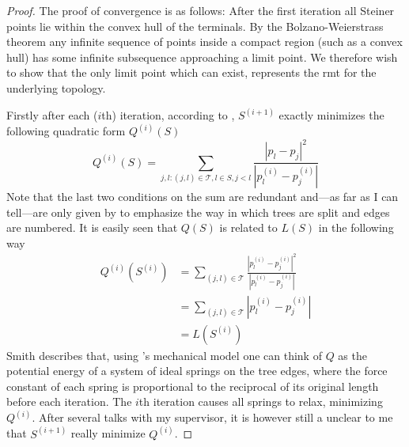 \begin{proof}
The proof of convergence is as follows: After the first iteration all Steiner
points lie within the convex hull of the terminals. By the Bolzano-Weierstrass
theorem any infinite sequence of points inside a compact region (such as a
convex hull) has some infinite subsequence approaching a limit point. We
therefore wish to show that the only limit point which can exist, represents
the \ac{rmt} for the underlying topology.

Firstly after each ($i$th) iteration, according to \textcite{smith1992},
$S^{(i+1)}$ exactly minimizes the following quadratic form $Q^{(i)}(S)$
%
\begin{equation}
  Q^{(i)}(S) = \sum_{j,l : (j,l) \in \mathcal{T}, l \in S, j < l }
  \frac{|p_l - p_j|^2}{|p^{(i)}_l - p^{(i)}_j|}
\end{equation}
%
Note that the last two conditions on the sum are redundant and---as far as I can
tell---are only given by \citeauthor{smith1992} to emphasize the way in which
trees are split and edges are numbered. It is easily seen that $Q(S)$ is related to
$L(S)$ in the following way
%
\begin{align}
  Q^{(i)}(S^{(i)})
  &= \sum_{(j,l) \in \mathcal{T}}
    \frac{|p^{(i)}_l - p^{(i)}_j|^2}{|p^{(i)}_l - p^{(i)}_j|} \\
  &= \sum_{(j,l) \in \mathcal{T}} |p^{(i)}_l - p^{(i)}_j| \\
  &= L(S^{(i)}) \label{eq:24}
\end{align}
%
Smith describes that, using \textcite{gilbert1968}'s mechanical model one can
think of $Q$ as the potential energy of a system of ideal springs on the tree
edges, where the force constant of each spring is proportional to the reciprocal
of its original length before each iteration. The $i$th iteration causes all
springs to relax, minimizing $Q^{(i)}$. After several talks with my supervisor,
it is however still a unclear to me that $S^{(i+1)}$ really minimize $Q^{(i)}$.


\end{proof}
